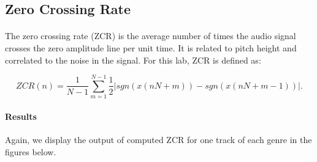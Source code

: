 \documentclass[11pt,a4paper]{article}
\begin{document}
\subsection{Zero Crossing Rate}
\paragraph*{} The zero crossing rate (ZCR) is the average number of times the audio signal crosses the zero amplitude line per unit time. It is related to pitch height and correlated to the noise in the signal. For this lab, ZCR is defined as:

\begin{equation}
ZCR(n)=\frac{1}{N-1}\sum_{m=1}^{N-1}\frac{1}{2}|sgn(x(nN+m))-sgn(x(nN+m-1))|.
\end{equation}

\paragraph{Results} Again, we display the output of computed ZCR for one track of each genre in the figures below.
\end{document}
